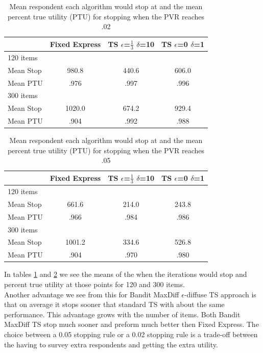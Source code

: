 \documentclass[nonblindrev]{informs3}
\begin{document}
\begin{table}
\begin{center}
\begin{tabular}{l | c | c | c }
 & Fixed Express &  TS $\epsilon$=$\frac{1}{3}$ $\delta$=10  &TS $\epsilon$=0 $\delta$=1  \\
\hline
120 items&&&\\
Mean Stop&  980.8 &  440.6 &  606.0 \\
Mean PTU& .976 & .997 & .996 \\
\hline
300 items&&&\\
Mean Stop& 1020.0 &  674.2 &  929.4\\
Mean PTU& .904 & .992 & .988 \\
\hline
\end{tabular}
\end{center}
\caption{Mean respondent each algorithm would stop at and the mean percent true utility (PTU) for stopping when the PVR reaches .02}
\label{table:stop2}
\end{table}
\begin{table}
\begin{center}
\begin{tabular}{l | c | c | c }

 & Fixed Express &  TS $\epsilon$=$\frac{1}{3}$ $\delta$=10  &TS $\epsilon$=0 $\delta$=1 \\
\hline
120 items&&&\\
Mean Stop& 661.6 &  214.0 & 243.8 \\
Mean PTU& .966 & .984 & .986 \\
\hline
300 items&&&\\
Mean Stop& 1001.2 &  334.6 &  526.8\\
Mean PTU& .904 & .970 & .980 \\
\hline
\end{tabular}
\end{center}
\caption{Mean respondent each algorithm would stop at and the mean percent true utility (PTU) for stopping when the PVR reaches .05}
\label{table:stop5}
\end{table}
In tables \ref{table:stop2} and \ref{table:stop5} we see the means of the when the iterations would stop and percent true utility at those points for 120 and 300 items.\\ Another advantage we see from this for Bandit MaxDiff $\epsilon$-diffuse TS approach is that on average it stops sooner that standard TS with about the same performance. This advantage grows with the number of items. Both Bandit MaxDiff TS stop much sooner and preform much better then Fixed Express. The choice between a 0.05 stopping rule or a 0.02 stopping rule is a trade-off between the having to survey extra respondents and getting the extra utility.
\end{document}
